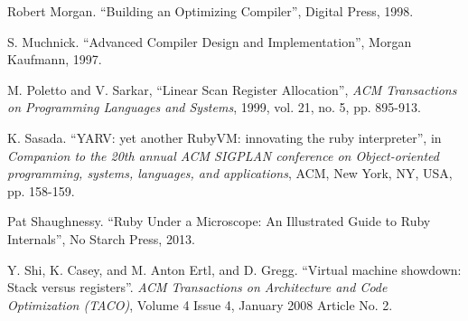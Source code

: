 \documentclass[preprint]{sigplanconf}
\begin{document}
\begin{thebibliography}{}
 Robert Morgan.  ``Building an Optimizing
  Compiler'',  Digital Press, 1998.

 S. Muchnick. ``Advanced Compiler Design and
  Implementation'',  Morgan Kaufmann, 1997.

M. Poletto and V. Sarkar, ``Linear Scan Register Allocation'',
\emph{ACM Transactions on Programming Languages and Systems}, 1999,
vol. 21, no. 5, pp. 895-913.
      
K. Sasada. ``YARV: yet another RubyVM: innovating the ruby
interpreter'', in \emph{Companion to the 20th annual ACM SIGPLAN
conference on Object-oriented programming, systems, languages, and
applications}, ACM, New York, NY, USA, pp. 158-159.

Pat Shaughnessy. ``Ruby Under a Microscope: An Illustrated Guide to
Ruby Internals'', No Starch Press, 2013.
  
Y. Shi, K. Casey, and M. Anton Ertl, and D. Gregg. ``Virtual machine
showdown: Stack versus registers''. \emph{ACM Transactions on Architecture
 and Code Optimization (TACO)}, Volume 4 Issue 4, January 2008
Article No. 2.

\end{thebibliography}
\end{document}
